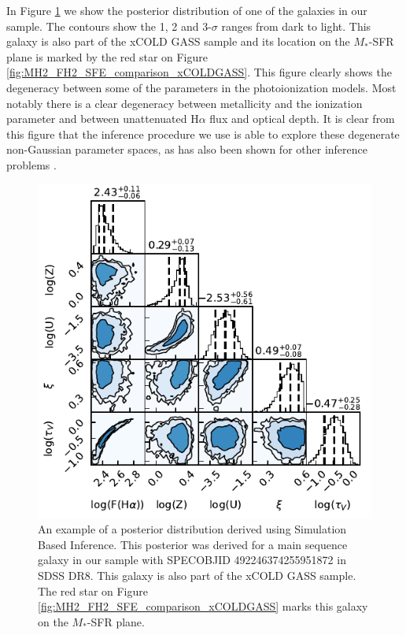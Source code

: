 \documentclass[fleqn,usenatbib]{mnras}
\begin{document}
In Figure \ref{fig:corner_plot_example} we show the posterior distribution of one of the galaxies in our sample. The contours show the 1, 2 and 3-$\sigma$ ranges from dark to light. This galaxy is also part of the xCOLD GASS sample and its location on the $M_{*}$-SFR plane is marked by the red star on Figure \ref{fig:MH2_FH2_SFE_comparison_xCOLDGASS}. This figure clearly shows the degeneracy between some of the parameters in the photoionization models. Most notably there is a clear degeneracy between metallicity and the ionization parameter and between unattenuated H$\alpha$ flux and optical depth. It is clear from this figure that the inference procedure we use is able to explore these degenerate non-Gaussian parameter spaces, as has also been shown for other inference problems \citep{greenberg2019}.

\begin{figure}
    \centering
    \includegraphics[width=\columnwidth]{figures/fig2.pdf}
    \caption{An example of a posterior distribution derived using Simulation Based Inference. This posterior was derived for a main sequence galaxy in our sample with SPECOBJID 492246374255951872 in SDSS DR8. This galaxy is also part of the xCOLD GASS sample. The red star on Figure \ref{fig:MH2_FH2_SFE_comparison_xCOLDGASS} marks this galaxy on the $M_{*}$-SFR plane.}
    \label{fig:corner_plot_example}
\end{figure}
\end{document}
